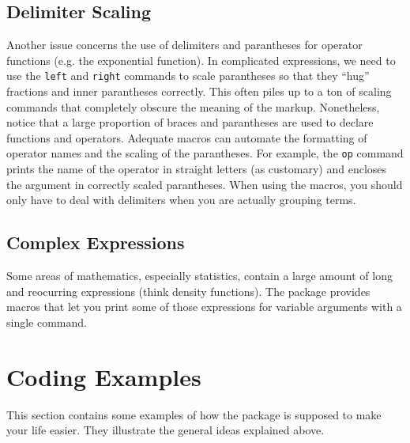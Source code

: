 \documentclass[a4paper,10pt]{scrartcl}
\begin{document}
\subsection{Delimiter Scaling}
Another issue concerns the use of delimiters and parantheses for operator functions (e.g. the exponential function). In complicated expressions, we need to use the \texttt{left} and \texttt{right} commands to scale parantheses so that they ``hug'' fractions and inner parantheses correctly. This often piles up to a ton of scaling commands that completely obscure the meaning of the markup. Nonetheless, notice that a large proportion of braces and parantheses are used to declare functions and operators. Adequate macros can automate the formatting of operator names and the scaling of the parantheses. For example, the \texttt{op} command prints the name of the operator in straight letters (as customary) and encloses the argument in correctly scaled parantheses. When using the macros, you should only have to deal with delimiters when you are actually grouping terms.
\subsection{Complex Expressions}
Some areas of mathematics, especially statistics, contain a large amount of long and reocurring expressions (think density functions). The package provides macros that let you print some of those expressions for variable arguments with a single command.

\section{Coding Examples}
This section contains some examples of how the package is supposed to make your life easier. They illustrate the general ideas explained above.
\end{document}
